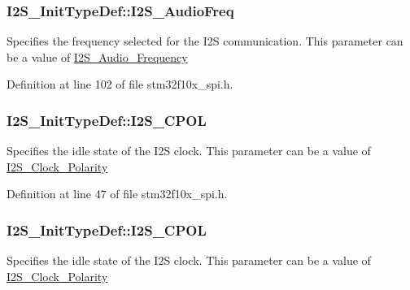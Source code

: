 \subsubsection[{\texorpdfstring{I2\+S\+\_\+\+Audio\+Freq}{I2S_AudioFreq}}]{ I2\+S\+\_\+\+Init\+Type\+Def\+::\+I2\+S\+\_\+\+Audio\+Freq}\hypertarget{struct_i2_s___init_type_def_a87674c5fbccad53b7646565f35d1fc0a}{}\label{struct_i2_s___init_type_def_a87674c5fbccad53b7646565f35d1fc0a}
Specifies the frequency selected for the I2S communication. This parameter can be a value of \hyperlink{group___i2_s___audio___frequency}{I2\+S\+\_\+\+Audio\+\_\+\+Frequency} 

Definition at line 102 of file stm32f10x\+\_\+spi.\+h.

\subsubsection[{\texorpdfstring{I2\+S\+\_\+\+C\+P\+OL}{I2S_CPOL}}]{ I2\+S\+\_\+\+Init\+Type\+Def\+::\+I2\+S\+\_\+\+C\+P\+OL}\hypertarget{struct_i2_s___init_type_def_a80e9c3ee7980d1b0905a228b3f49e9d3}{}\label{struct_i2_s___init_type_def_a80e9c3ee7980d1b0905a228b3f49e9d3}
Specifies the idle state of the I2S clock. This parameter can be a value of \hyperlink{group___i2_s___clock___polarity}{I2\+S\+\_\+\+Clock\+\_\+\+Polarity} 

Definition at line 47 of file stm32f10x\+\_\+spi.\+h.

\subsubsection[{\texorpdfstring{I2\+S\+\_\+\+C\+P\+OL}{I2S_CPOL}}]{ I2\+S\+\_\+\+Init\+Type\+Def\+::\+I2\+S\+\_\+\+C\+P\+OL}\hypertarget{struct_i2_s___init_type_def_aeb7741728520734ec2eab95d2143778c}{}\label{struct_i2_s___init_type_def_aeb7741728520734ec2eab95d2143778c}
Specifies the idle state of the I2S clock. This parameter can be a value of \hyperlink{group___i2_s___clock___polarity}{I2\+S\+\_\+\+Clock\+\_\+\+Polarity} 

